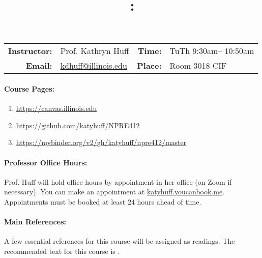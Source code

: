 \documentclass[11pt, a4paper]{article}
\title{\CourseNumber: \CourseTitle\\}
\author{\CourseUniversity}
\date{\CourseSemester \CourseYear}
\makeatletter
\newcommand{\CourseNumber}{NPRE412}
\newcommand{\CourseInstructor}{Prof. Kathryn Huff\xspace}%
\newcommand{\CourseDays}{TuTh\xspace}%
\newcommand{\CourseStart}{9:30am\xspace}%
\newcommand{\CourseEnd}{10:50am\xspace}%
\newcommand{\CourseInstructorEmail}{kdhuff@illinois.edu}
\newcommand{\HuffOfficeHourPlace}{111B Talbot\xspace}
\newcommand{\CourseRoom}{Room 3018\xspace}%
\newcommand{\CourseBuilding}{CIF\xspace}%
\makeatother
\begin{document}
\maketitle
\renewcommand{\arraystretch}{1.5}
\begin{center}
\begin{table}[h]
\begin{tabularx}{\textwidth}{rXrX}
\hline
\textbf{Instructor:} & \CourseInstructor & \textbf{Time:} & \CourseDays \CourseStart -- \CourseEnd \\
\textbf{Email:} &  \href{mailto:\CourseInstructorEmail}{\CourseInstructorEmail} & \textbf{Place:} & \CourseRoom \CourseBuilding\\
\hline
\end{tabularx}
\end{table}
\end{center}

\paragraph{Course Pages:}
\begin{enumerate}
        \item \url{https://canvas.illinois.edu}
        \item \url{https://github.com/katyhuff/\CourseNumber}
        \item \url{https://mybinder.org/v2/gh/katyhuff/npre412/master}
\end{enumerate}


\paragraph{Professor Office Hours:} Prof. Huff will hold office hours by 
appointment in her office (on Zoom if necessary). You can make an appointment at 
\url{katyhuff.youcanbook.me}. Appointments must be booked at least 24 hours 
ahead of time.

\paragraph{Main References:}
A few essential references for this course will be assigned as readings. The 
recommended text for this course is \cite{tsoulfanidis_nuclear_2013}.

\renewcommand{\refname}{\normalfont\selectfont\normalsize}

\end{document}
